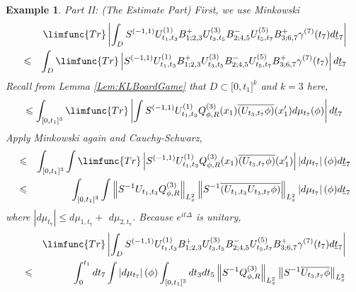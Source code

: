\documentclass[12pt,letterpaper,leqno]{amsart}
\theoremstyle{plain}
\newtheorem{example}{Example}
\numberwithin{equation}{section}
\numberwithin{theorem}{section}
\numberwithin{proposition}{section}
\numberwithin{lemma}{section}
\numberwithin{corollary}{section}
\begin{document}
\begin{example}
Part II: (The Estimate Part) First, we use Minkowski%
\begin{eqnarray*}
&&\limfunc{Tr}\left\vert
\int_{D}S^{(-1,1)}U_{t_{1},t_{3}}^{(1)}B_{1;2,3}^{+}U_{t_{3},t_{5}}^{(3)}B_{2;4,5}^{-}U_{t_{5},t_{7}}^{(5)}B_{3;6,7}^{+}\gamma ^{(7)}(t_{7})d%
\underline{t}_{7}\right\vert \\
&\leqslant &\int_{D}\limfunc{Tr}\left\vert
S^{(-1,1)}U_{t_{1},t_{3}}^{(1)}B_{1;2,3}^{+}U_{t_{3},t_{5}}^{(3)}B_{2;4,5}^{-}U_{t_{5},t_{7}}^{(5)}B_{3;6,7}^{+}\gamma ^{(7)}(t_{7})\right\vert d%
\underline{t}_{7}
\end{eqnarray*}%
Recall from Lemma \ref{Lem:KLBoardGame} that $D\subset \lbrack 0,t_{1}]^{k}$
and $k=3$ here, 
\begin{equation*}
\leqslant \int_{\lbrack 0,t_{1}]^{3}}\limfunc{Tr}\left\vert \int
S^{(-1,1)}U_{t_{1},t_{3}}^{(1)}Q_{\phi ,R}^{(3)}(x_{1})\overline{\left(
U_{t_{3},t_{7}}\phi \right) }(x_{1}^{\prime })d\mu _{t_{7}}(\phi
)\right\vert d\underline{t}_{7}
\end{equation*}%
Apply Minkowski again and Cauchy-Schwarz,%
\begin{eqnarray*}
&\leqslant &\int_{[0,t_{1}]^{3}}\int \limfunc{Tr}\left\vert
S^{(-1,1)}U_{t_{1},t_{3}}^{(1)}Q_{\phi ,R}^{(3)}(x_{1})\overline{\left(
U_{t_{3},t_{7}}\phi \right) }(x_{1}^{\prime })\right\vert \left\vert d\mu
_{t_{7}}\right\vert (\phi )d\underline{t}_{7} \\
&\leqslant &\int_{[0,t_{1}]^{3}}\int \left\Vert S^{-1}U_{t_{1},t_{3}}Q_{\phi
,R}^{(3)}\right\Vert _{L_{x}^{2}}\left\Vert S^{-1}\overline{\left(
U_{t_{1},t_{3}}U_{t_{3},t_{7}}\phi \right) }\right\Vert
_{L_{x}^{2}}\left\vert d\mu _{t_{7}}\right\vert (\phi )d\underline{t}_{7}
\end{eqnarray*}%
where $\left\vert d\mu _{t_{7}}\right\vert \leqslant d\mu _{1,t_{7}}+$ $d\mu
_{2,t_{7}}$. Because $e^{it\Delta }$ is unitary, 
\begin{eqnarray*}
&&\limfunc{Tr}\left\vert
\int_{D}S^{(-1,1)}U_{t_{1},t_{3}}^{(1)}B_{1;2,3}^{+}U_{t_{3},t_{5}}^{(3)}B_{2;4,5}^{-}U_{t_{5},t_{7}}^{(5)}B_{3;6,7}^{+}\gamma ^{(7)}(t_{7})d%
\underline{t}_{7}\right\vert \\
&\leqslant &\int_{0}^{t_{1}}dt_{7}\int \left\vert d\mu _{t_{7}}\right\vert
(\phi )\int_{[0,t_{1}]^{2}}dt_{3}dt_{5}\left\Vert S^{-1}Q_{\phi
,R}^{(3)}\right\Vert _{L_{x}^{2}}\left\Vert S^{-1}\overline{%
U_{t_{3},t_{7}}\phi }\right\Vert _{L_{x}^{2}}
\end{eqnarray*}


\end{example}
\end{document}
